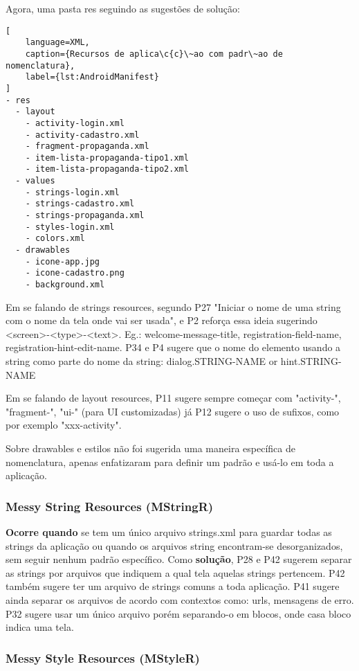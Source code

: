Agora, uma pasta res seguindo as sugest\~oes de solu\c{c}\~ao:

\begin{lstlisting}[
	language=XML, 
	caption={Recursos de aplica\c{c}\~ao com padr\~ao de nomenclatura}, 
	label={lst:AndroidManifest}
]
- res 
  - layout 
    - activity-login.xml 
    - activity-cadastro.xml 
    - fragment-propaganda.xml 
    - item-lista-propaganda-tipo1.xml 
    - item-lista-propaganda-tipo2.xml 
  - values 
    - strings-login.xml  
    - strings-cadastro.xml  
    - strings-propaganda.xml  
    - styles-login.xml 
    - colors.xml 
  - drawables 
    - icone-app.jpg 
    - icone-cadastro.png 
    - background.xml 
\end{lstlisting}

Em se falando de strings resources, segundo P27 "Iniciar o nome de uma string com o nome da tela onde vai ser usada", e P2 refor\c{c}a essa ideia sugerindo <screen>-<type>-<text>. Eg.: welcome-message-title, registration-field-name, registration-hint-edit-name. P34 e P4 sugere que o nome do elemento usando a string como parte do nome da string: dialog.STRING-NAME or hint.STRING-NAME

Em se falando de layout resources, P11 sugere sempre come\c{c}ar com "activity-", "fragment-", "ui-" (para UI customizadas) j\'a P12 sugere o uso de sufixos, como por exemplo "xxx-activity".

Sobre drawables e estilos n\~ao foi sugerida uma maneira espec\'ifica de nomenclatura, apenas enfatizaram para definir um padr\~ao e us\'a-lo em toda a aplica\c{c}\~ao.


\subsubsection{Messy String Resources (MStringR)} 

\textbf{Ocorre quando} se tem um \'unico arquivo strings.xml para guardar todas as strings da aplica\c{c}\~ao ou quando os arquivos string encontram-se desorganizados, sem seguir nenhum padr\~ao espec\'ifico. Como \textbf{solu\c{c}\~ao}, P28 e P42 sugerem separar as strings por arquivos que indiquem a qual tela aquelas strings pertencem. P42 tamb\'em sugere ter um arquivo de strings comuns a toda aplica\c{c}\~ao. P41 sugere ainda separar os arquivos de acordo com contextos como: urls, mensagens de erro. P32 sugere usar um \'unico arquivo por\'em separando-o em blocos, onde casa bloco indica uma tela.



\subsubsection{Messy Style Resources (MStyleR)} 

